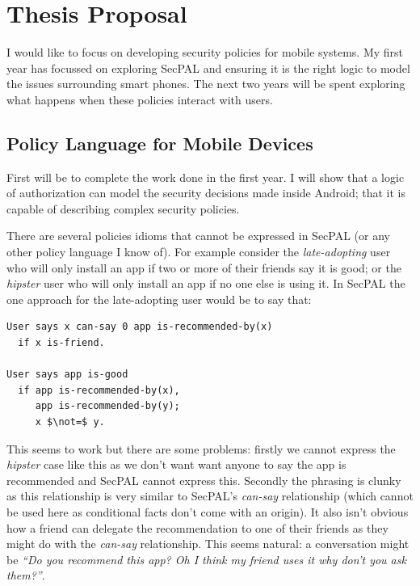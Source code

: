 \documentclass[a4paper]{article}
\begin{document}
\section{Thesis Proposal}

I would like to focus on developing security policies for mobile systems.  My
first year has focussed on exploring SecPAL and ensuring it is the right logic
to model the issues surrounding smart phones.  The next two years will be spent
exploring what happens when these policies interact with users.

\subsection{Policy Language for Mobile Devices}\label{sec:proposallang}

First will be to complete the work done in the first year. I will show that
a logic of authorization can model the security decisions made inside Android;
that it is capable of describing complex security policies. 

There are several policies idioms that cannot be expressed in SecPAL (or any
other policy language I know of).  For example consider the \emph{late-adopting}
user who will only install an app if two or more of their friends say it is
good; or the \emph{hipster} user who will only install an app if no one else is
using it.  In SecPAL the one approach for the late-adopting user would be to say
that:
\begin{lstlisting}[language=SecPAL, mathescape=true]
User says x can-say 0 app is-recommended-by(x)
  if x is-friend.

User says app is-good
  if app is-recommended-by(x),
     app is-recommended-by(y);
     x $\not=$ y.
\end{lstlisting}
This seems to work but there are some problems: firstly we cannot express the
\emph{hipster} case like this as we don't want want anyone to say the app is
recommended and SecPAL cannot express this.  Secondly the phrasing is clunky as
this relationship is very similar to SecPAL's \emph{can-say} relationship (which
cannot be used here as conditional facts don't come with an origin).  It also
isn't obvious how a friend can delegate the recommendation to one of their
friends as they might do with the \emph{can-say} relationship. This seems
natural: a conversation might be \emph{``Do you recommend this app? Oh I think
my friend uses it why don't you ask them?''}. 
\end{document}
